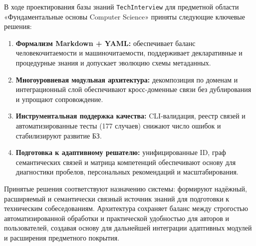 
В ходе проектирования базы знаний \texttt{TechInterview} для предметной области «Фундаментальные основы Computer Science» приняты следующие ключевые решения:

\begin{enumerate}
    \item \textbf{Формализм Markdown + YAML:} обеспечивает баланс человекочитаемости и машиночитаемости, поддерживает декларативные и процедурные знания и допускает эволюцию схемы метаданных.
    \item \textbf{Многоуровневая модульная архитектура:} декомпозиция по доменам и интеграционный слой обеспечивают кросс-доменные связи без дублирования и упрощают сопровождение.
    \item \textbf{Инструментальная поддержка качества:} CLI-валидация, реестр связей и автоматизированные тесты (177 случаев) снижают число ошибок и стабилизируют развитие БЗ.
    \item \textbf{Подготовка к адаптивному решателю:} унифицированные ID, граф семантических связей и матрица компетенций обеспечивают основу для диагностики пробелов, персональных рекомендаций и масштабирования.
\end{enumerate}

Принятые решения соответствуют назначению системы: формируют надёжный, расширяемый и семантически связный источник знаний для подготовки к техническим собеседованиям. Архитектура сохраняет баланс между строгостью автоматизированной обработки и практической удобностью для авторов и пользователей, создавая основу для дальнейшей интеграции адаптивных модулей и расширения предметного покрытия.